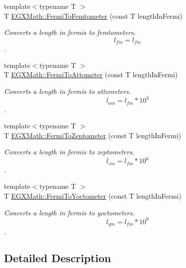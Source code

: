 \begin{DoxyCompactItemize}
{\footnotesize template$<$typename T $>$ }\\T \mbox{\hyperlink{group___e_g_x_math-_conversions-_length_conversions-_non-_s_i-_fermi-_s_i_ga79a9f408068ba1cbba8db425c8923340}{E\+G\+X\+Math\+::\+Fermi\+To\+Femtometer}} (const T length\+In\+Fermi)
\begin{DoxyCompactList}\small\item\em Converts a length in fermis to femtometers. \[ l_{fm}=l_{fm} \]. \end{DoxyCompactList}\item 
{\footnotesize template$<$typename T $>$ }\\T \mbox{\hyperlink{group___e_g_x_math-_conversions-_length_conversions-_non-_s_i-_fermi-_s_i_ga52a21bc3c66ca1103e6dd65ad528510a}{E\+G\+X\+Math\+::\+Fermi\+To\+Attometer}} (const T length\+In\+Fermi)
\begin{DoxyCompactList}\small\item\em Converts a length in fermis to attometers. \[ l_{am}=l_{fm} * 10^{3} \]. \end{DoxyCompactList}\item 
{\footnotesize template$<$typename T $>$ }\\T \mbox{\hyperlink{group___e_g_x_math-_conversions-_length_conversions-_non-_s_i-_fermi-_s_i_ga0f95ec9ae0444053a1d45ca652970f49}{E\+G\+X\+Math\+::\+Fermi\+To\+Zeptometer}} (const T length\+In\+Fermi)
\begin{DoxyCompactList}\small\item\em Converts a length in fermis to zeptometers. \[ l_{zm}=l_{fm} * 10^{6} \]. \end{DoxyCompactList}\item 
{\footnotesize template$<$typename T $>$ }\\T \mbox{\hyperlink{group___e_g_x_math-_conversions-_length_conversions-_non-_s_i-_fermi-_s_i_gaea7ea589aa3d8270226626bf82c66595}{E\+G\+X\+Math\+::\+Fermi\+To\+Yoctometer}} (const T length\+In\+Fermi)
\begin{DoxyCompactList}\small\item\em Converts a length in fermis to yoctometers. \[ l_{ym}=l_{fm} * 10^{9} \]. \end{DoxyCompactList}\end{DoxyCompactItemize}


\subsection{Detailed Description}


